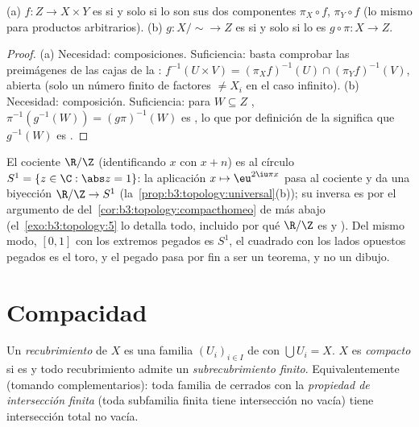 \begin{proposition}
\label{prop:b3:topology:universal}
(a) $f \colon Z \to X \times Y$ es
 si y solo si lo son sus
dos componentes $\pi_X \circ f$, $\pi_Y \circ f$ (lo mismo para
productos arbitrarios). (b) $g \colon X/{\sim} \to Z$ es
 si y solo si lo es
$g \circ \pi
\colon X \to Z$.
\end{proposition}

\begin{proof}
(a) Necesidad: composiciones. Suficiencia: basta comprobar las
preimágenes de las cajas de la :
$f^{-1}(U \times V) = (\pi_Xf)^{-1}(U)
\cap (\pi_Yf)^{-1}(V)$, abierta (solo un número finito de factores
$\neq X_i$ en el caso infinito). (b) Necesidad: composición.
Suficiencia: para $W \subseteq Z$ ,
$\pi^{-1}(g^{-1}(W)) = (g\pi)^{-1}(W)$ es , lo que por definición
de la 
significa que $g^{-1}(W)$ es .
\end{proof}

\begin{example}\label{ex:b3:topology:circle}
El cociente $\R/\Z$ (identificando $x$ con $x + n$) es
 al círculo
$S^1 = \{z \in \C : \abs z = 1\}$: la aplicación $x
\mapsto \eu^{2\iu\pi x}$ pasa al cociente y da una biyección
 $\R/\Z \to S^1$
(la~\cref{prop:b3:topology:universal}(b)); su inversa es
 por el argumento de
 del~\cref{cor:b3:topology:compacthomeo} de más abajo
(el~\cref{exo:b3:topology:5} lo detalla todo, incluido por qué $\R/\Z$
es  y
). Del mismo modo, $[0,1]$ con
los extremos pegados es $S^1$, el cuadrado con los lados opuestos
pegados es el toro, y el pegado pasa por fin a ser un teorema, y no un
dibujo.
\end{example}

\section{Compacidad}

\begin{definition}\label{def:b3:topology:compact}
Un \emph{recubrimiento } de $X$ es una familia $(U_i)_{i\in I}$
de  con $\bigcup U_i = X$.
$X$ es \emph{compacto} si es
 y todo recubrimiento
 admite un \emph{subrecubrimiento finito}. Equivalentemente
(tomando complementarios): toda familia de cerrados con la
\emph{propiedad de intersección finita} (toda subfamilia finita tiene
intersección no vacía) tiene intersección total no vacía.
\end{definition}

